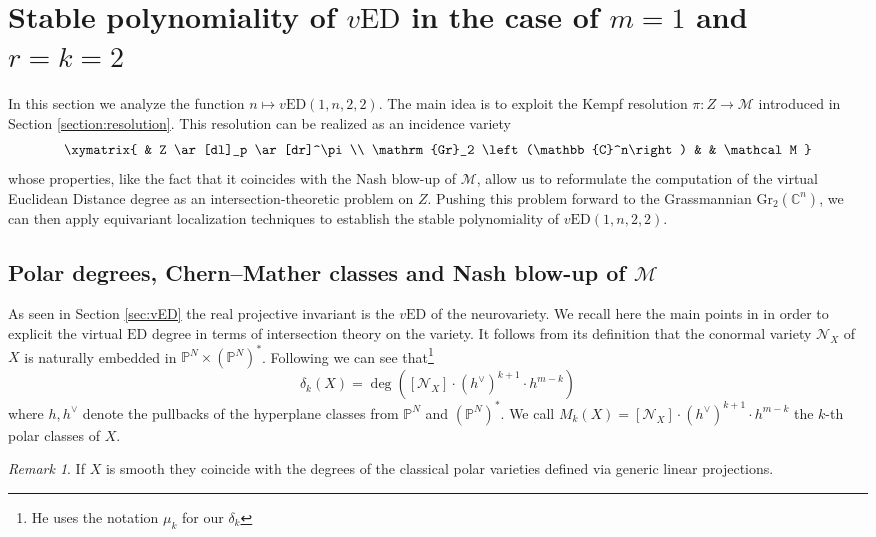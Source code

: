 \documentclass[11pt]{article}
\numberwithin{equation}{section}
\numberwithin{figure}{section}
\theoremstyle{plain}
\theoremstyle{definition}
\theoremstyle{remark}
\newtheorem{rem}[thm]{Remark}
\newcommand{\C}{\mathbb{C}}
\renewcommand{\P}{\mathbb{P}}
\newcommand{\Gr}{\mathrm{Gr}}
\newcommand{\ED}{\mathrm{ED}}
\newcommand{\vED}{v\mathrm{ED}}
\begin{document}
\section{Stable polynomiality of $\vED$ in the case of $m=1$ and $r=k=2$}\label{sec:Ourcase}

In this section we analyze the function $n \mapsto \vED\left(1,n,2,2\right)$.
The main idea is to exploit the Kempf resolution $\pi: Z \to \mathcal M$
introduced in Section \ref{section:resolution}. This resolution can be realized
as an incidence variety
\[
\xymatrix{
& Z \ar[dl]_p \ar[dr]^\pi \\
\Gr_2 \left(\C^n\right) & & \mathcal M
}
\]
whose properties, like the fact that it coincides with the
Nash blow-up of $\mathcal M$, allow us to reformulate the computation of the
virtual Euclidean Distance degree as an intersection-theoretic problem on $Z$.
Pushing this problem forward to the Grassmannian $\Gr_2 \left(\C^n\right)$, we can then apply
equivariant localization techniques to establish the stable polynomiality of
$\vED\left(1,n,2,2\right)$.

\subsection{Polar degrees, Chern–Mather classes and Nash blow-up of $\mathcal M$}\label{sec:polardegrees}

As seen in Section \ref{sec:vED} the real projective invariant is the $\vED$ of the neurovariety. We recall here the main points in \cite[Section 1]{Piene79} in order to explicit the virtual $\ED$ degree in terms of intersection theory on the variety.
It follows from its definition that the conormal variety $\mathcal N _X$ of $X$ is naturally embedded in $\P^N \times\left(\P^N\right)^\ast$. Following \cite{Piene79} we can see that\footnote{He uses the notation $\mu _k$ for our $\delta_k$}
\begin{equation}\label{eq:delta_k}
\delta_k \left( X\right)=\deg\left( \left[ \mathcal N_X \right]\cdot \left( h^\vee\right)^{k+1}\cdot h^{m-k}\right)
\end{equation}
where $h,h^\vee$ denote the pullbacks of the hyperplane classes from $\P^N$ and $\left(\P^N\right)^\ast$. We call $M_k\left( X\right)=\left[ \mathcal N_X \right]\cdot \left( h^\vee\right)^{k+1}\cdot h^{m-k}$ the $k$-th polar classes of $X$.

\begin{rem}
    If $X$ is smooth they coincide with the degrees of the classical polar varieties defined via generic linear projections.
\end{rem}
\end{document}
